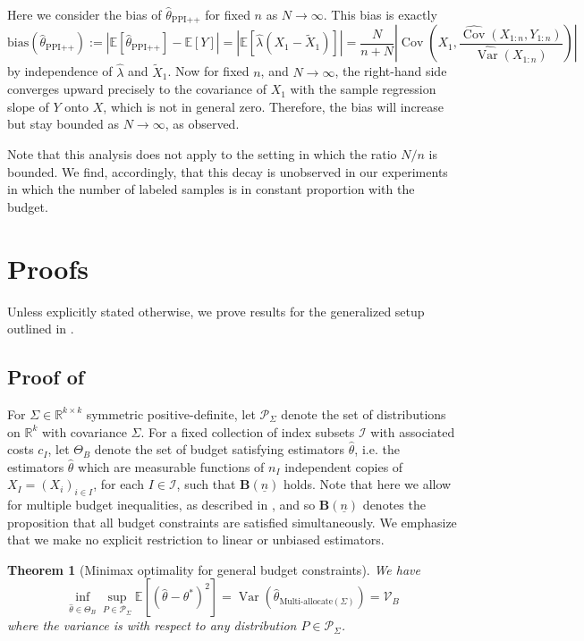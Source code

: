 \documentclass{article} %
\newcommand{\R}{\mathbb{R}}
\newcommand{\Ex}{\mathbb{E}}
\newcommand{\adam}[1]{ {\color{magenta}[AF: #1]}}
\DeclareMathOperator{\Var}{Var}
\DeclareMathOperator{\Cov}{Cov}
\newtheorem{theorem}{Theorem}
\begin{document}
Here we consider the bias of $\hat{\theta}_{\text{PPI++}}$ for fixed $n$ as $N\to\infty$. This bias is exactly
\[
\text{bias}(\hat{\theta}_{\text{PPI++}}):=\left|\Ex[\hat{\theta}_{\text{PPI++}}]-\Ex[Y]\right| = \left|\Ex[\widehat{\lambda}(X_1-\tilde{X}_1)]\right|=\frac{N}{n+N}\left|\Cov\left(X_1,\frac{\widehat{\Cov}(X_{1:n},Y_{1:n})}{\widehat{\Var}(X_{1:n})}\right)\right|
\]
by independence of $\widehat{\lambda}$ and $\tilde{X}_1$. Now for fixed $n$, and $N\to\infty$, the right-hand side converges upward precisely to the covariance of $X_1$ with the sample regression slope of $Y$ onto $X$, which is not in general zero. Therefore, the bias will increase but stay bounded as $N\to\infty$, as observed.

Note that this analysis does not apply to the setting in which the ratio $N/n$ is bounded. We find, accordingly, that this decay is unobserved in our experiments in which the number of labeled samples is in constant proportion with the budget.


\clearpage
\section{Proofs}
\label{app:proofs}
Unless explicitly stated otherwise, we prove results for the generalized setup outlined in .

\subsection{Proof of }\label{app:minimax_proof}
For $\Sigma\in\R^{k\times k}$ symmetric positive-definite, let $\mathcal{P}_\Sigma$ denote the set of distributions on $\R^k$ with covariance $\Sigma$. For a fixed collection of index subsets $\mathcal{I}$ with associated costs $c_I$, let $\Theta_B$ denote the set of budget satisfying estimators $\hat{\theta}$, i.e. the estimators $\hat{\theta}$ which are measurable functions of $n_I$ independent copies of $X_I=(X_i)_{i\in I}$, for each $I\in\mathcal{I}$, such that $\mathbf{B}(\underline{n})$ holds. Note that here we allow for multiple budget inequalities, as described in , and so $\mathbf{B}(\underline{n})$ denotes the proposition that all budget constraints are satisfied simultaneously. We emphasize that we make no explicit restriction to linear or unbiased estimators.


\begin{theorem}[Minimax optimality for general budget constraints]\label{thm:1}
    We have
    \[
    \inf_{\hat{\theta}\in\Theta_B}\sup_{P\in\mathcal{P}_\Sigma} \Ex\left[(\hat{\theta}-\theta^*)^2\right] = \Var 
    \left(\hat{\theta}_{\text{Multi-allocate$(\Sigma)$}}\right) = \mathcal{V}_B
    \]
    where the variance is with respect to any distribution $P\in\mathcal{P}_\Sigma$.
\end{theorem}
    
\end{document}
